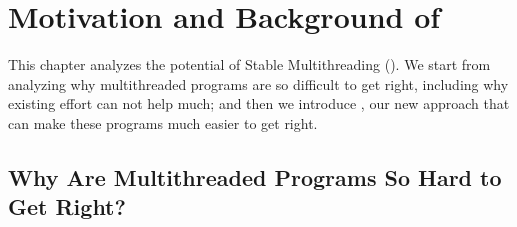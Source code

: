 \chapter{Motivation and Background of \smt} \label{sec:smt-motivation}

This chapter analyzes the potential of Stable Multithreading (\smt). We
start from analyzing why multithreaded programs are so difficult to get right,
including why existing effort can not help much; and then we introduce \smt, our
new approach that can make these programs much easier to get right.

\section{Why Are Multithreaded Programs So Hard to Get Right?}
\label{sec:smt-why}

